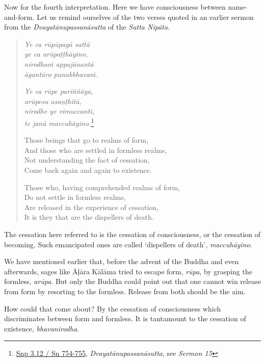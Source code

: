Now for the fourth interpretation. Here we have consciousness between name-and-form. Let us remind ourselves of the two verses quoted in an earlier sermon from the \emph{Dvayatānupassanāsutta} of the \emph{Sutta Nipāta}.

\begin{quote}
\emph{Ye ca rūpūpagā sattā}\\
\emph{ye ca arūpaṭṭhāyino,}\\
\emph{nirodhaṁ appajānantā}\\
\emph{āgantāro punabbhavaṁ.}

\emph{Ye ca rūpe pariññāya,}\\
\emph{arūpesu asaṇṭhitā,}\\
\emph{nirodhe ye vimuccanti,}\\
\emph{te janā maccuhāyino.}\footnote{\href{https://suttacentral.net/snp3.12/pli/ms}{Snp 3.12 / Sn 754-755}, \emph{Dvayatānupassanāsutta}, see \emph{Sermon 15}}

Those beings that go to realms of form,\\
And those who are settled in formless realms,\\
Not understanding the fact of cessation,\\
Come back again and again to existence.

Those who, having comprehended realms of form,\\
Do not settle in formless realms,\\
Are released in the experience of cessation,\\
It is they that are the dispellers of death.
\end{quote}

The cessation here referred to is the cessation of consciousness, or the cessation of becoming. Such emancipated ones are called `dispellers of death', \emph{maccuhāyino}.

\enlargethispage{\baselineskip}

We have mentioned earlier that, before the advent of the Buddha and even afterwards, sages like Āḷāra Kālāma tried to escape form, \emph{rūpa}, by grasping the formless, \emph{arūpa}. But only the Buddha could point out that one cannot win release from form by resorting to the formless. Release from both should be the aim.

How could that come about? By the cessation of consciousness which discriminates between form and formless. It is tantamount to the cessation of existence, \emph{bhavanirodha}.

